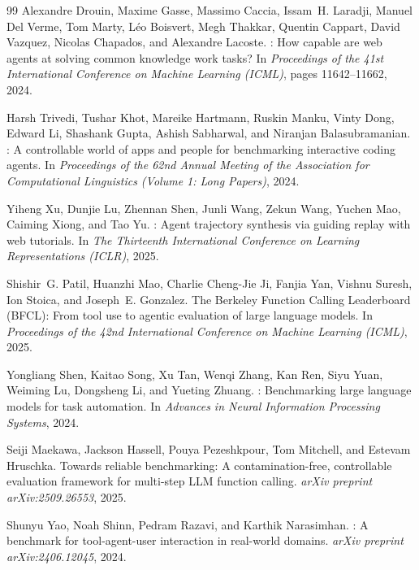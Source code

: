 \begin{thebibliography}{99}
Alexandre Drouin, Maxime Gasse, Massimo Caccia, Issam~H. Laradji, Manuel Del Verme, Tom Marty, L{\'e}o Boisvert, Megh Thakkar, Quentin Cappart, David Vazquez, Nicolas Chapados, and Alexandre Lacoste.
: How capable are web agents at solving common knowledge work tasks?
\newblock In \emph{Proceedings of the 41st International Conference on Machine Learning (ICML)}, pages 11642--11662, 2024.

Harsh Trivedi, Tushar Khot, Mareike Hartmann, Ruskin Manku, Vinty Dong, Edward Li, Shashank Gupta, Ashish Sabharwal, and Niranjan Balasubramanian.
: A controllable world of apps and people for benchmarking interactive coding agents.
\newblock In \emph{Proceedings of the 62nd Annual Meeting of the Association for Computational Linguistics (Volume 1: Long Papers)}, 2024.

Yiheng Xu, Dunjie Lu, Zhennan Shen, Junli Wang, Zekun Wang, Yuchen Mao, Caiming Xiong, and Tao Yu.
: Agent trajectory synthesis via guiding replay with web tutorials.
\newblock In \emph{The Thirteenth International Conference on Learning Representations (ICLR)}, 2025.

Shishir~G. Patil, Huanzhi Mao, Charlie Cheng-Jie Ji, Fanjia Yan, Vishnu Suresh, Ion Stoica, and Joseph~E. Gonzalez.
\newblock The {Berkeley Function Calling Leaderboard (BFCL)}: From tool use to agentic evaluation of large language models.
\newblock In \emph{Proceedings of the 42nd International Conference on Machine Learning (ICML)}, 2025.

Yongliang Shen, Kaitao Song, Xu Tan, Wenqi Zhang, Kan Ren, Siyu Yuan, Weiming Lu, Dongsheng Li, and Yueting Zhuang.
: Benchmarking large language models for task automation.
\newblock In \emph{Advances in Neural Information Processing Systems}, 2024.

Seiji Maekawa, Jackson Hassell, Pouya Pezeshkpour, Tom Mitchell, and Estevam Hruschka.
\newblock Towards reliable benchmarking: A contamination-free, controllable evaluation framework for multi-step {LLM} function calling.
\newblock \emph{arXiv preprint arXiv:2509.26553}, 2025.

Shunyu Yao, Noah Shinn, Pedram Razavi, and Karthik Narasimhan.
: A benchmark for tool-agent-user interaction in real-world domains.
\newblock \emph{arXiv preprint arXiv:2406.12045}, 2024.


\end{thebibliography}
